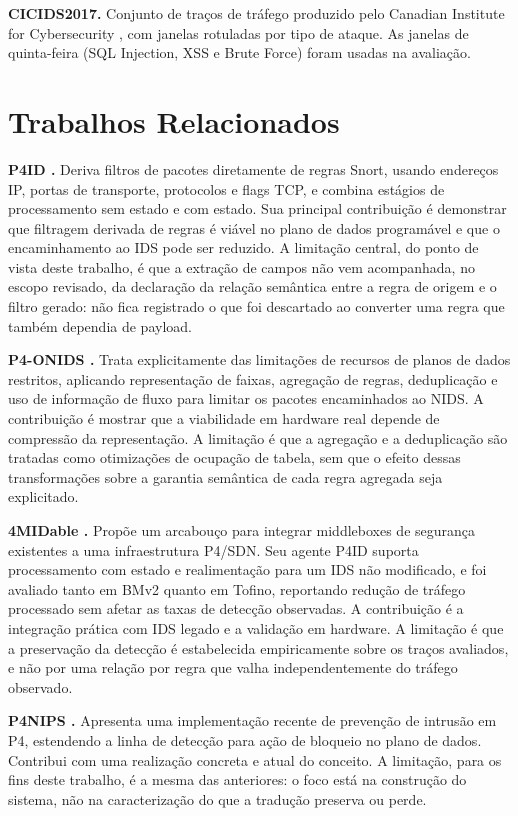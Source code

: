\documentclass[12pt]{article}
\begin{document}
\textbf{CICIDS2017.} Conjunto de traços de tráfego produzido pelo Canadian
Institute for Cybersecurity \cite{sharafaldin2018cicids}, com janelas
rotuladas por tipo de ataque. As janelas de quinta-feira (SQL Injection, XSS e
Brute Force) foram usadas na avaliação.

\section{Trabalhos Relacionados}

\textbf{P4ID \cite{lewis2019p4id}.} Deriva filtros de pacotes diretamente de
regras Snort, usando endereços IP, portas de transporte, protocolos e flags
TCP, e combina estágios de processamento sem estado e com estado. Sua
principal contribuição é demonstrar que filtragem derivada de regras é viável
no plano de dados programável e que o encaminhamento ao IDS pode ser reduzido.
A limitação central, do ponto de vista deste trabalho, é que a extração de
campos não vem acompanhada, no escopo revisado, da declaração da relação
semântica entre a regra de origem e o filtro gerado: não fica registrado o que
foi descartado ao converter uma regra que também dependia de payload.

\textbf{P4-ONIDS \cite{tavares2021p4onids}.} Trata explicitamente das
limitações de recursos de planos de dados restritos, aplicando representação
de faixas, agregação de regras, deduplicação e uso de informação de fluxo para
limitar os pacotes encaminhados ao NIDS. A contribuição é mostrar que a
viabilidade em hardware real depende de compressão da representação. A
limitação é que a agregação e a deduplicação são tratadas como otimizações de
ocupação de tabela, sem que o efeito dessas transformações sobre a garantia
semântica de cada regra agregada seja explicitado.

\textbf{4MIDable \cite{lewis2023fourmidable}.} Propõe um arcabouço para
integrar middleboxes de segurança existentes a uma infraestrutura P4/SDN. Seu
agente P4ID suporta processamento com estado e realimentação para um IDS não
modificado, e foi avaliado tanto em BMv2 quanto em Tofino, reportando redução
de tráfego processado sem afetar as taxas de detecção observadas. A
contribuição é a integração prática com IDS legado e a validação em hardware.
A limitação é que a preservação da detecção é estabelecida empiricamente sobre
os traços avaliados, e não por uma relação por regra que valha
independentemente do tráfego observado.

\textbf{P4NIPS \cite{senoski2025p4nips}.} Apresenta uma implementação recente
de prevenção de intrusão em P4, estendendo a linha de detecção para ação de
bloqueio no plano de dados. Contribui com uma realização concreta e atual do
conceito. A limitação, para os fins deste trabalho, é a mesma das anteriores:
o foco está na construção do sistema, não na caracterização do que a tradução
preserva ou perde.
\end{document}
